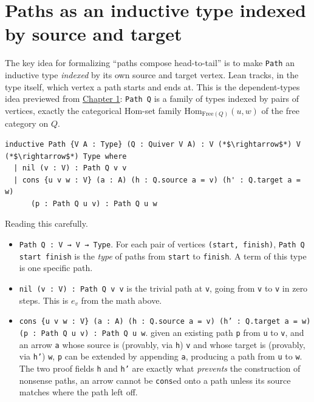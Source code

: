 \section{Paths as an inductive type indexed by source and target}\label{sec:12-path-algebras:04-paths-as-inductive-type:1}

The key idea for formalizing ``paths compose head-to-tail'' is to make \texttt{Path} an inductive type \emph{indexed} by its own source and target vertex. Lean tracks, in the type itself, which vertex a path starts and ends at. This is the dependent-types idea previewed from \hyperref[sec:01-basics:03-dependent-types:1]{Chapter 1}: \texttt{Path Q} is a family of types indexed by pairs of vertices, exactly the categorical \(\mathrm{Hom}\)-set family \(\mathrm{Hom}_{\mathrm{Free}(Q)}(u,w)\) of the free category on \(Q\).

\begin{lstlisting}
inductive Path {V A : Type} (Q : Quiver V A) : V (*$\rightarrow$*) V (*$\rightarrow$*) Type where
  | nil (v : V) : Path Q v v
  | cons {u v w : V} (a : A) (h : Q.source a = v) (h' : Q.target a = w)
      (p : Path Q u v) : Path Q u w
\end{lstlisting}

Reading this carefully.

\begin{itemize}
\tightlist
\item
  \texttt{Path Q : V → V → Type}. For each pair of vertices \texttt{(start, finish)}, \texttt{Path Q start finish} is the \emph{type} of paths from \texttt{start} to \texttt{finish}. A term of this type is one specific path.
\item
  \texttt{nil (v : V) : Path Q v v} is the trivial path at \texttt{v}, going from \texttt{v} to \texttt{v} in zero steps. This is \(e_v\) from the math above.
\item
  \texttt{cons \{u v w : V\} (a : A) (h : Q.source a = v) (h' : Q.target a = w) (p : Path Q u v) : Path Q u w}. given an existing path \texttt{p} from \texttt{u} to \texttt{v}, and an arrow \texttt{a} whose source is (provably, via \texttt{h}) \texttt{v} and whose target is (provably, via \texttt{h'}) \texttt{w}, \texttt{p} can be extended by appending \texttt{a}, producing a path from \texttt{u} to \texttt{w}. The two proof fields \texttt{h} and \texttt{h'} are exactly what \emph{prevents} the construction of nonsense paths, an arrow cannot be \texttt{cons}ed onto a path unless its source matches where the path left off.
\end{itemize}

